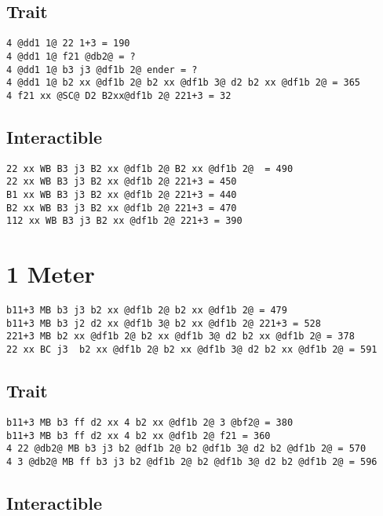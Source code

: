\documentclass[main.tex]{subfiles}
\begin{document}
\subsection{Trait}

\begin{lstlisting}[language=FG]
4 @dd1 1@ 22 1+3 = 190
4 @dd1 1@ f21 @db2@ = ?
4 @dd1 1@ b3 j3 @df1b 2@ ender = ?
4 @dd1 1@ b2 xx @df1b 2@ b2 xx @df1b 3@ d2 b2 xx @df1b 2@ = 365  
4 f21 xx @SC@ D2 B2xx@df1b 2@ 221+3 = 32
\end{lstlisting}


\subsection{Interactible}
\begin{lstlisting}[language=FG]
22 xx WB B3 j3 B2 xx @df1b 2@ B2 xx @df1b 2@  = 490
22 xx WB B3 j3 B2 xx @df1b 2@ 221+3 = 450
B1 xx WB B3 j3 B2 xx @df1b 2@ 221+3 = 440
B2 xx WB B3 j3 B2 xx @df1b 2@ 221+3 = 470
112 xx WB B3 j3 B2 xx @df1b 2@ 221+3 = 390
\end{lstlisting}

\section{1 Meter}


\begin{lstlisting}[language=FG]
b11+3 MB b3 j3 b2 xx @df1b 2@ b2 xx @df1b 2@ = 479
b11+3 MB b3 j2 d2 xx @df1b 3@ b2 xx @df1b 2@ 221+3 = 528
221+3 MB b2 xx @df1b 2@ b2 xx @df1b 3@ d2 b2 xx @df1b 2@ = 378
22 xx BC j3  b2 xx @df1b 2@ b2 xx @df1b 3@ d2 b2 xx @df1b 2@ = 591
\end{lstlisting}

\subsection{Trait}
\begin{lstlisting}[language=FG]
b11+3 MB b3 ff d2 xx 4 b2 xx @df1b 2@ 3 @bf2@ = 380
b11+3 MB b3 ff d2 xx 4 b2 xx @df1b 2@ f21 = 360
4 22 @db2@ MB b3 j3 b2 @df1b 2@ b2 @df1b 3@ d2 b2 @df1b 2@ = 570 
4 3 @db2@ MB ff b3 j3 b2 @df1b 2@ b2 @df1b 3@ d2 b2 @df1b 2@ = 596 
\end{lstlisting}


\subsection{Interactible}
\begin{lstlisting}[language=FG]

\end{lstlisting}
\end{document}
